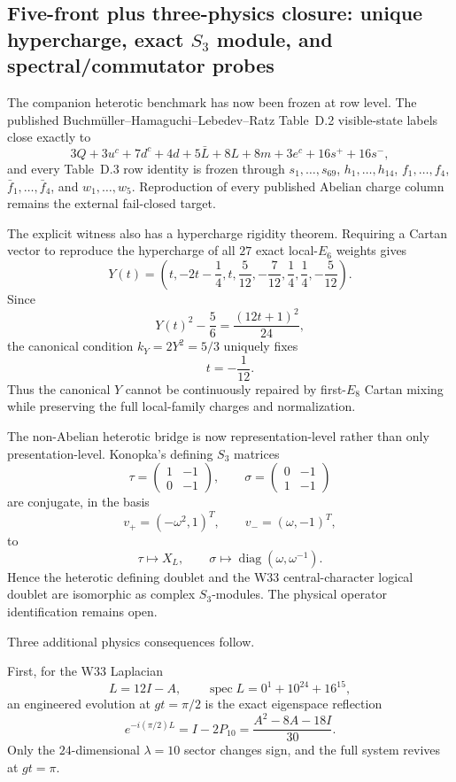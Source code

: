 \subsection{Five-front plus three-physics closure: unique hypercharge, exact \(S_3\) module, and spectral/commutator probes}
\label{sec:20260918-five-plus-three}

The companion heterotic benchmark has now been frozen at row level.  The
published Buchm\"uller--Hamaguchi--Lebedev--Ratz Table~D.2 visible-state labels
close exactly to
\[
3Q+3u^c+7d^c+4d+5\bar L+8L+8m+3e^c+16s^++16s^-,
\]
and every Table~D.3 row identity is frozen through
\(s_1,\ldots,s_{69}\), \(h_1,\ldots,h_{14}\),
\(f_1,\ldots,f_4\), \(\bar f_1,\ldots,\bar f_4\), and
\(w_1,\ldots,w_5\).  Reproduction of every published Abelian charge column
remains the external fail-closed target.

The explicit witness also has a hypercharge rigidity theorem.  Requiring a
Cartan vector to reproduce the hypercharge of all \(27\) exact local-\(E_6\)
weights gives
\[
Y(t)=\left(t,-2t-\frac14,t,\frac5{12},-\frac7{12},
\frac14,\frac14,-\frac5{12}\right).
\]
Since
\[
Y(t)^2-\frac56=\frac{(12t+1)^2}{24},
\]
the canonical condition \(k_Y=2Y^2=5/3\) uniquely fixes
\[
t=-\frac1{12}.
\]
Thus the canonical \(Y\) cannot be continuously repaired by first-\(E_8\)
Cartan mixing while preserving the full local-family charges and normalization.

The non-Abelian heterotic bridge is now representation-level rather than only
presentation-level.  Konopka's defining \(S_3\) matrices
\[
\tau=\begin{pmatrix}1&-1\\0&-1\end{pmatrix},\qquad
\sigma=\begin{pmatrix}0&-1\\1&-1\end{pmatrix}
\]
are conjugate, in the basis
\[
v_+=(-\omega^2,1)^T,\qquad v_-=(\omega,-1)^T,
\]
to
\[
\tau\mapsto X_L,\qquad
\sigma\mapsto\operatorname{diag}(\omega,\omega^{-1}).
\]
Hence the heterotic defining doublet and the W33 central-character logical
doublet are isomorphic as complex \(S_3\)-modules.  The physical operator
identification remains open.

Three additional physics consequences follow.

First, for the W33 Laplacian
\[
L=12I-A,\qquad \operatorname{spec}L=0^1+10^{24}+16^{15},
\]
an engineered evolution at \(gt=\pi/2\) is the exact eigenspace reflection
\[
e^{-i(\pi/2)L}
=I-2P_{10}
=\frac{A^2-8A-18I}{30}.
\]
Only the \(24\)-dimensional \(\lambda=10\) sector changes sign, and the full
system revives at \(gt=\pi\).

